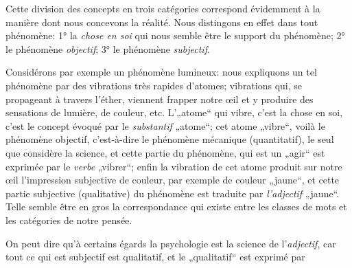 {    Cette division des concepts en trois catégories correspond
    évidemment à la manière dont nous concevons la réalité. Nous
    distingons en effet dans tout phénomène: 1° la \emph{chose en soi}
    qui nous semble être le support du phénomène; 2° le phénomène
    \emph{objectif}; 3° le phénomène \emph{subjectif}.

    Considérons par exemple un phénomène lumineux: nous expliquons un
    tel phénomène par des vibrations très rapides d’atomes;
    vibrations qui, se propageant à travers l’éther, viennent frapper
    notre œil et y produire des sensations de lumière, de couleur,
    etc. L’„atome“ qui vibre, c’est la chose en soi, c’est le concept
    évoqué par le \emph{substantif} „atome“; cet atome „vibre“, voilà
    le phénomène objectif, c’est-à-dire le phénomène mécanique
    (quantitatif), le seul que considère la science, et cette partie
    du phénomène, qui est un „agir“ est exprimée par le \emph{verbe}
    „vibrer“; enfin la vibration de cet atome produit sur notre œil
    l’impression subjective de couleur, par exemple de couleur
    „jaune“, et cette partie subjective (qualitative) du phénomène est
    traduite par \emph{l'adjectif} „jaune“. Telle semble être en gros
    la correspondance qui existe entre les classes de mots et les
    catégories de notre pensée.

    On peut dire qu’à certains égards la psychologie est la science de
    l'\emph{adjectif}, car tout ce qui est subjectif est qualitatif,
    et le „qualitatif“ est exprimé par
  }
  
